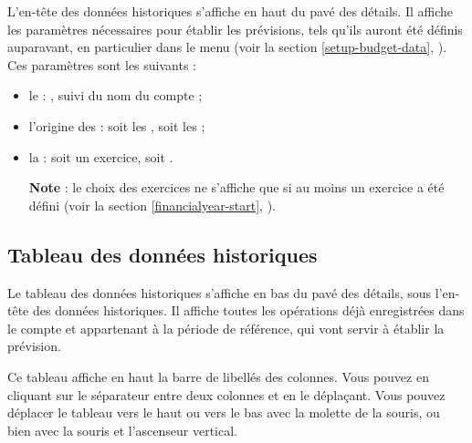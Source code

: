 L'en-tête des données historiques s'affiche en haut du pavé des détails. Il affiche les paramètres nécessaires pour établir les prévisions,  tels qu'ils auront été définis auparavant, en particulier dans le menu  (voir la section \vref{setup-budget-data}, ). Ces paramètres sont les suivants :

\begin{itemize}
	\item le  : , suivi du nom du compte ;
	\item l'origine des  : soit les  , soit les  ;
	\item la  : soit un exercice, soit .

	\textbf{Note} : le choix des exercices ne s'affiche que si au moins un exercice a été défini (voir la section \vref{financialyear-start}, ).
\end{itemize}


\subsection{Tableau des données historiques\label{budget-data-table}}

Le tableau des données historiques s'affiche en bas du pavé des détails, sous l'en-tête des données historiques. Il affiche toutes les opérations déjà enregistrées dans le compte et appartenant à la période de référence, qui vont servir à établir la prévision.

Ce tableau affiche en haut la barre de libellés des colonnes. Vous pouvez  en cliquant sur le séparateur entre deux colonnes et en le déplaçant. Vous pouvez déplacer le tableau vers le haut ou vers le bas avec la molette de la souris, ou bien avec la souris et l'ascenseur vertical. 


